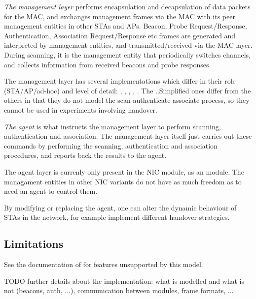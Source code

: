 \textit{The management layer} performs encapsulation and decapsulation of data packets
for the MAC, and exchanges management frames via the MAC with its peer
management entities in other STAs and APs. Beacon, Probe Request/Response,
Authentication, Association Request/Response etc frames are generated
and interpreted by management entities, and transmitted/received via
the MAC layer. During scanning, it is the management entity that periodically
switches channels, and collects information from received beacons and
probe responses.

The management layer has several implementations which differ in their role
(STA/AP/ad-hoc) and level of detail: ,
, , ,
. The ..Simplified ones differ from the others
in that they do not model the scan-authenticate-associate process,
so they cannot be used in experiments involving handover.

\textit{The agent} is what instructs the management layer to perform
scanning, authentication and association. The management layer itself
just carries out these commands by performing the scanning, authentication
and association procedures, and reports back the results to the agent.

The agent layer is currenly only present in the  NIC module,
as an  module. The managament entities in other NIC
variants do not have as much freedom as to need an agent to control them.

By modifying or replacing the agent, one can alter the dynamic behaviour
of STAs in the network, for example implement different handover strategies.

\subsection{Limitations}

See the documentation of  for features unsupported by this
model.

\ifdraft TODO
 further details about the implementation: what is modelled and what is
 not (beacons, auth, ...), communication between modules, frame formats,
 ...
\fi




